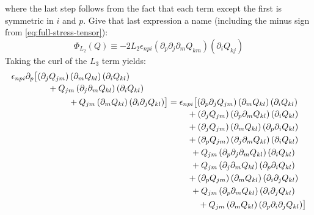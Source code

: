 \documentclass[reqno]{article}
\begin{document}
where the last step follows from the fact that each term except the first is symmetric in $i$ and $p$.
Give that last expression a name (including the minus sign from \eqref{eq:full-stress-tensor}):
\begin{equation}
	\Phi_{L_2} (Q) \equiv -2 L_2 \epsilon_{npi} \left( \partial_p \partial_j \partial_m Q_{km} \right) \left( \partial_i Q_{kj} \right)
\end{equation}
Taking the curl of the $L_3$ term yields:
\begin{equation}
\begin{multlined}[b]
	\epsilon_{npi} \partial_p \bigl[
	\left( \partial_j Q_{jm} \right) \left( \partial_m Q_{kl} \right) \left( \partial_i Q_{kl} \right) \\
	\hspace{0.5cm}+ Q_{jm} \left( \partial_j \partial_m Q_{kl} \right) \left( \partial_i Q_{kl} \right) \\
	\hspace{2cm}+ Q_{jm} \left( \partial_m Q_{kl} \right) \left( \partial_i \partial_j Q_{kl} \right)
	\bigr]
\end{multlined}
=
\begin{multlined}[t]
	\epsilon_{npi} \bigl[
	\left( \partial_p \partial_j Q_{jm} \right) \left( \partial_m Q_{kl} \right) \left( \partial_i Q_{kl} \right) \\
	+ \left( \partial_j Q_{jm} \right) \left( \partial_p \partial_m Q_{kl} \right) \left( \partial_i Q_{kl} \right) \\
	+ \left( \partial_j Q_{jm} \right) \left( \partial_m Q_{kl} \right) \left( \partial_p \partial_i Q_{kl} \right) \\
	+ \left( \partial_p Q_{jm} \right) \left( \partial_j \partial_m Q_{kl} \right) \left( \partial_i Q_{kl} \right)\\
	+ Q_{jm} \left( \partial_p \partial_j \partial_m Q_{kl} \right) \left( \partial_i Q_{kl} \right) \\
	+ Q_{jm} \left( \partial_j \partial_m Q_{kl} \right) \left( \partial_p \partial_i Q_{kl} \right) \\
	+ \left( \partial_p Q_{jm} \right) \left( \partial_m Q_{kl} \right) \left( \partial_i \partial_j Q_{kl} \right) \\
	+ Q_{jm} \left( \partial_p \partial_m Q_{kl} \right) \left( \partial_i \partial_j Q_{kl} \right) \\
	+ Q_{jm} \left( \partial_m Q_{kl} \right) \left( \partial_p \partial_i \partial_j Q_{kl} \right)
	\bigr]
\end{multlined}
\end{equation}
\end{document}
